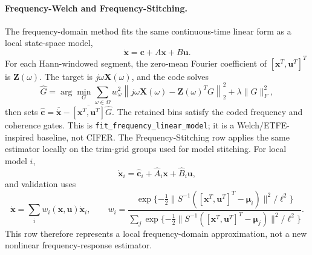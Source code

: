 \documentclass[11pt]{article}
\begin{document}
\paragraph{Frequency-Welch and Frequency-Stitching.}
The frequency-domain method fits the same continuous-time linear form as a
local state-space model,
\begin{equation}
    \dot{\mathbf{x}}=\mathbf{c}+A\mathbf{x}+B\mathbf{u}.
\end{equation}
For each Hann-windowed segment, the zero-mean Fourier coefficient of
$[\mathbf{x}^T,\mathbf{u}^T]^T$ is $\mathbf{Z}(\omega)$. The target is
$j\omega\mathbf{X}(\omega)$, and the code solves
\begin{equation}
    \widehat{G}
    =
    \arg\min_G
    \sum_{\omega\in\Omega}
    w_\omega^2
    \left\|
    j\omega\mathbf{X}(\omega)
    -
    \mathbf{Z}(\omega)^TG
    \right\|_2^2
    +\lambda\|G\|_F^2,
    \label{eq:code_frequency}
\end{equation}
then sets
$\widehat{\mathbf{c}}=\overline{\dot{\mathbf{x}}}
-\overline{[\mathbf{x}^T,\mathbf{u}^T]}\widehat{G}$.
The retained bins satisfy the coded frequency and coherence gates. This is
\texttt{fit\_frequency\_linear\_model}; it is a Welch/ETFE-inspired baseline,
not CIFER.
The Frequency-Stitching row applies the same estimator locally on the trim-grid
groups used for model stitching. For local model $i$,
\[
    \dot{\mathbf{x}}_i
    =
    \widehat{\mathbf{c}}_i
    +
    \widehat{A}_i\mathbf{x}
    +
    \widehat{B}_i\mathbf{u},
\]
and validation uses
\[
    \dot{\mathbf{x}}
    =
    \sum_i w_i(\mathbf{x},\mathbf{u})\dot{\mathbf{x}}_i,
    \qquad
    w_i =
    \frac{\exp\{-\frac{1}{2}\|S^{-1}([\mathbf{x}^T,\mathbf{u}^T]^T-\boldsymbol{\mu}_i)\|^2/\ell^2\}}
    {\sum_j \exp\{-\frac{1}{2}\|S^{-1}([\mathbf{x}^T,\mathbf{u}^T]^T-\boldsymbol{\mu}_j)\|^2/\ell^2\}}.
\]
This row therefore represents a local frequency-domain approximation, not a
new nonlinear frequency-response estimator.
\end{document}
